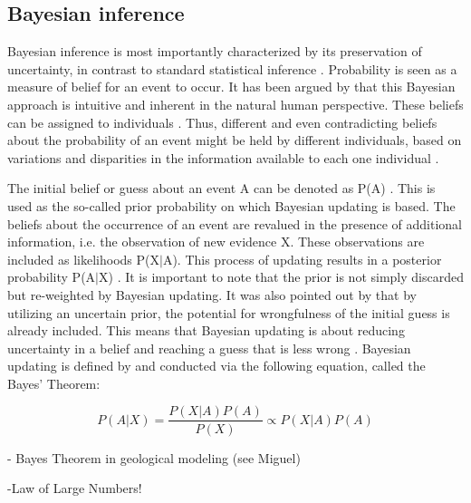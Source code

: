         \subsection{Bayesian inference}
        Bayesian inference is most importantly characterized by its preservation of uncertainty, in contrast to standard statistical inference \citep{davidson2015}. Probability is seen as a measure of belief for an event to occur. It has been argued by \cite{davidson2015}  that this Bayesian approach is intuitive and inherent in the natural human perspective. These beliefs can be assigned to individuals \citep{davidson2015}. Thus, different and even contradicting beliefs about the probability of an event might be held by different individuals, based on variations and disparities in the information available to each one individual \citep{davidson2015}.
        
        The initial belief or guess about an event A can be denoted as P(A) \citep{davidson2015}. This is used as the so-called prior probability on which Bayesian updating is based. The beliefs about the occurrence of an event are revalued in the presence of additional information, i.e. the observation of new evidence X. These observations are included as likelihoods P(X$|$A). This process of updating results in a posterior probability P(A$|$X) \citep{davidson2015}. It is important to note that the prior is not simply discarded but re-weighted by Bayesian updating. It was also pointed out by \citet{davidson2015} that by utilizing an uncertain prior, the potential for wrongfulness of the initial guess is already included. This means that Bayesian updating is about reducing uncertainty in a belief and reaching a guess that is less wrong \citep{davidson2015}.
        Bayesian updating is defined by and conducted via the following equation, called the Bayes' Theorem:
        
        \begin{equation}\label{eq:BayesTheorem}
        P(A|X) = \frac{P(X|A)P(A)}{P(X)}
        \propto P(X|A)P(A)
        \end{equation}
        
        - Bayes Theorem in geological modeling (see Miguel)
        
        -Law of Large Numbers!
        
